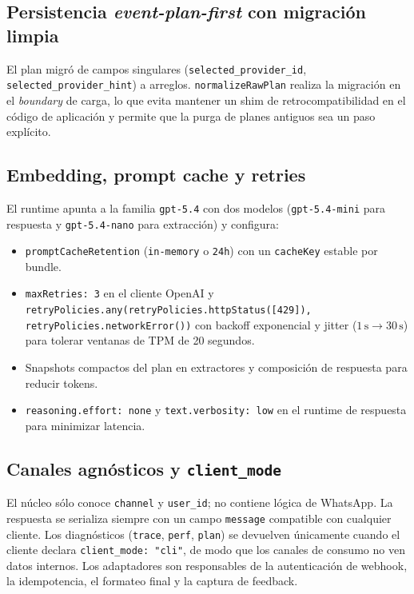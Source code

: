 \documentclass[11pt,a4paper]{article}
\begin{document}
\subsection{Persistencia \emph{event-plan-first} con migración limpia}

El plan migró de campos singulares (\texttt{selected\_provider\_id},
\texttt{selected\_provider\_hint}) a arreglos. \texttt{normalizeRawPlan}
realiza la migración en el \emph{boundary} de carga, lo que evita
mantener un shim de retrocompatibilidad en el código de aplicación y
permite que la purga de planes antiguos sea un paso explícito.

\subsection{Embedding, prompt cache y retries}

El runtime apunta a la familia \texttt{gpt-5.4} con dos modelos
(\texttt{gpt-5.4-mini} para respuesta y \texttt{gpt-5.4-nano} para
extracción) y configura:

\begin{itemize}[leftmargin=*,itemsep=1pt]
  \item \texttt{promptCacheRetention} (\texttt{in-memory} o
        \texttt{24h}) con un \texttt{cacheKey} estable por bundle.
  \item \texttt{maxRetries: 3} en el cliente OpenAI y
        \texttt{retryPolicies.any(retryPolicies.httpStatus([429]),
        retryPolicies.networkError())} con backoff exponencial y
        jitter ($1\,\mathrm{s} \to 30\,\mathrm{s}$) para tolerar ventanas
        de TPM de 20 segundos.
  \item Snapshots compactos del plan en extractores y composición de
        respuesta para reducir tokens.
  \item \texttt{reasoning.effort: none} y \texttt{text.verbosity: low}
        en el runtime de respuesta para minimizar latencia.
\end{itemize}

\subsection{Canales agnósticos y \texttt{client\_mode}}

El núcleo sólo conoce \texttt{channel} y \texttt{user\_id}; no contiene
lógica de WhatsApp. La respuesta se serializa siempre con un campo
\texttt{message} compatible con cualquier cliente. Los diagnósticos
(\texttt{trace}, \texttt{perf}, \texttt{plan}) se devuelven únicamente
cuando el cliente declara \texttt{client\_mode: "cli"}, de modo que
los canales de consumo no ven datos internos. Los adaptadores son
responsables de la autenticación de webhook, la idempotencia, el
formateo final y la captura de feedback.
\end{document}
